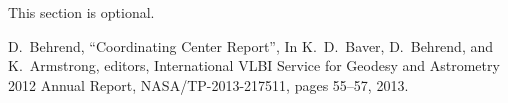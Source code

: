 \documentclass[twocolumn,twoside]{svmultivs_br} %
\begin{document}
This section is optional.
%
%
%
\begin{thebibliography}{99}

D.~Behrend, ``Coordinating Center Report'',
In K.\ D.\ Baver, D.\ Behrend, and K.\ Armstrong, editors, International
VLBI Service for Geodesy and Astrometry 2012 Annual Report,
NASA/TP-2013-217511, pages 55--57, 2013.

\end{thebibliography}
%
\end{document}
